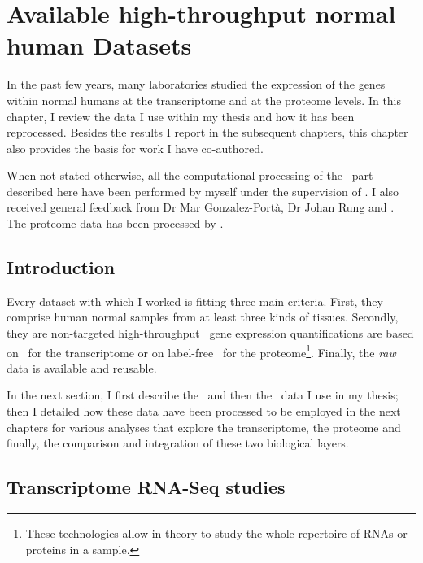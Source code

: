 \chapter{Available high-throughput normal human Datasets}
\label{ch:datasets}

\begin{comment}
\setlength{\epigraphwidth}{0.8\textwidth}%
\setlength{\epigraphrule}{0pt}%
\epigraphhead[70]{%
\epigraph{Data! Data! Data! I can’t make bricks without clay!}{Sherlock Homes\\
(Sir Arthur Conan Doyle)}}
\end{comment}


In the past few years, many laboratories studied the expression
of the genes within normal humans at the transcriptome and at
the proteome levels. In this chapter, I review the data I use within my thesis
and how it has been reprocessed.
Besides the results I report in the subsequent chapters,
this chapter also provides the basis for work
I have co-authored.

When not stated otherwise, all the computational processing of the \Rnaseq\ part
described here have been performed by myself under the supervision of
\alvis. I also received general feedback from Dr Mar Gonzalez-Portà,
Dr Johan Rung and \nuno. The proteome data has been processed by \james.


\section{Introduction}

Every dataset with which I worked is fitting three main criteria.
First, they comprise human normal samples from at least three kinds of tissues.
Secondly, they are non-targeted high-throughput \ie\ gene expression
quantifications are based on \Rnaseq\ for the transcriptome or on label-free \ms\
for the proteome\footnote{These technologies allow in theory to study the whole
repertoire of \glspl{RNA} or proteins in a sample.}.
Finally, the \emph{raw} data is available and reusable.

In the next section, I first describe the \Rnaseq\ and then the \ms\ data I use
in my thesis; then I detailed how these data have been processed to be
employed in the next chapters for various analyses that explore the transcriptome,
the proteome and finally, the comparison and integration of these two
biological layers.


\section{Transcriptome RNA-Seq studies}
\label{sec:rnaseq-data}

